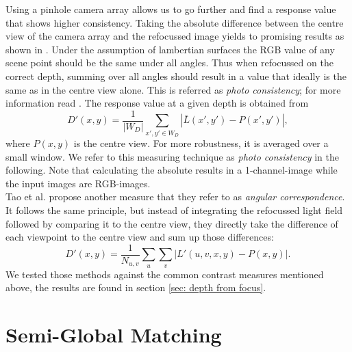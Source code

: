 \documentclass  [
  paper    = a4,
  BCOR     = 10mm,
  twoside,
  fontsize = 12pt,
  fleqn,
  toc      = bibnumbered,
  toc      = listofnumbered,
  numbers  = noendperiod,
  headings = normal,
  listof   = leveldown,
  version  = 3.03
]                                       {scrreprt}
\begin{document}
Using a pinhole camera array allows us to go further and find a response value that shows higher consistency. Taking the absolute difference between the centre view of the camera array and the refocussed image yields to promising results as shown in \cite{tao2017shape}. Under the assumption of lambertian surfaces the RGB value of any scene point should be the same under all angles. Thus when refocussed on the correct depth, summing over all angles should result in a value that ideally is the same as in the centre view alone. This is referred as \textit{photo consistency}; for more information read \cite{tao2017shape}.
The response value at a given depth is obtained from
\begin{equation}\label{key}
D'(x,y) = \frac{1}{|W_D|}\sum_{x',y' \in W_D} \left|\bar{L}(x',y')- P(x', y')\right|,
\end{equation}
where $P(x,  y)$ is the centre view. For more robustness, it is averaged over a small window. We refer to this measuring technique as \textit{photo consistency} in the following. Note that calculating the absolute results in a 1-channel-image while the input images are RGB-images. \\ Tao et al. propose another measure that they refer to as \textit{angular correspondence}. It follows the same principle, but instead of integrating the refocussed light field followed by comparing it to the centre view, they directly take the difference of each viewpoint to the centre view and sum up those differences:
\begin{equation}\label{eq:responsecorr}
D'(x,y) = \frac{1}{N_{u,v}}\sum_{u}\sum_{v}  \left|L'(u, v, x, y) - P(x,y)\right|.
\end{equation}
We tested those methods against the common contrast measures mentioned above, the results are found in section \ref{sec: depth from focus}.

\section{Semi-Global Matching}
\end{document}
